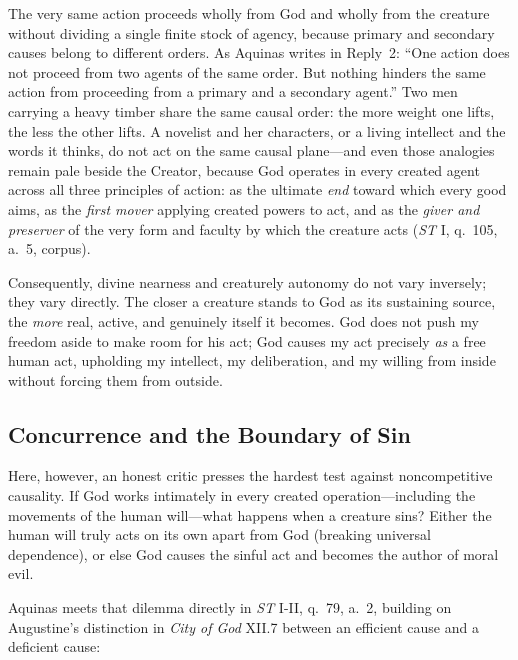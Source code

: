 The very same action proceeds wholly from God and wholly from the creature without dividing a single finite stock of agency, because primary and secondary causes belong to different orders. As Aquinas writes in Reply~2: ``One action does not proceed from two agents of the same order. But nothing hinders the same action from proceeding from a primary and a secondary agent.'' Two men carrying a heavy timber share the same causal order: the more weight one lifts, the less the other lifts. A novelist and her characters, or a living intellect and the words it thinks, do not act on the same causal plane---and even those analogies remain pale beside the Creator, because God operates in every created agent across all three principles of action: as the ultimate \emph{end} toward which every good aims, as the \emph{first mover} applying created powers to act, and as the \emph{giver and preserver} of the very form and faculty by which the creature acts (\emph{ST} I, q.\ 105, a.\ 5, corpus).

Consequently, divine nearness and creaturely autonomy do not vary inversely; they vary directly. The closer a creature stands to God as its sustaining source, the \emph{more} real, active, and genuinely itself it becomes. God does not push my freedom aside to make room for his act; God causes my act precisely \emph{as} a free human act, upholding my intellect, my deliberation, and my willing from inside without forcing them from outside.

\subsection{Concurrence and the Boundary of Sin}

Here, however, an honest critic presses the hardest test against noncompetitive causality. If God works intimately in every created operation---including the movements of the human will---what happens when a creature sins? Either the human will truly acts on its own apart from God (breaking universal dependence), or else God causes the sinful act and becomes the author of moral evil.

Aquinas meets that dilemma directly in \emph{ST} I-II, q.\ 79, a.\ 2, building on Augustine's distinction in \emph{City of God} XII.7 between an efficient cause and a deficient cause:

